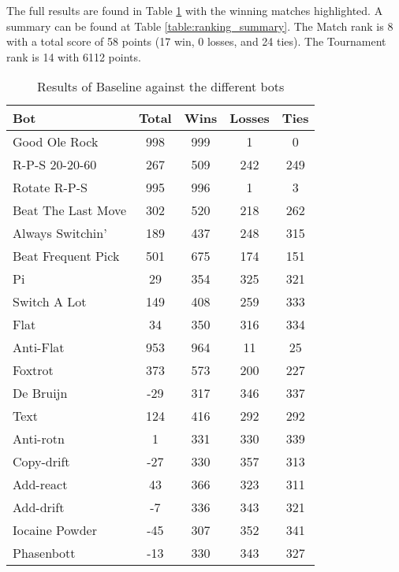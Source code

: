 The full results are found in Table \ref{table:base_results} with the winning matches highlighted. A summary can be found at Table \ref{table:ranking_summary}. The Match rank is 8 with a total score of 58 points (17 win, 0 losses, and 24 ties). The Tournament rank is 14 with 6112 points.

\begin{table}
    \caption{Results of Baseline against the different bots}
    \label{table:base_results}
    \centering
    \begin{tabular}{|l|c|c|c|c|}
        \hline
        \textbf{Bot} & \textbf{Total} & \textbf{Wins} & \textbf{Losses} & \textbf{Ties} \\ \hline
\rowcolor{HighlightRowColor} Good Ole Rock & 998 & 999 & 1 & 0 \\ \hline 
\rowcolor{HighlightRowColor} R-P-S 20-20-60 & 267 & 509 & 242 & 249 \\ \hline 
\rowcolor{HighlightRowColor} Rotate R-P-S & 995 & 996 & 1 & 3 \\ \hline 
\rowcolor{HighlightRowColor} Beat The Last Move & 302 & 520 & 218 & 262 \\ \hline 
\rowcolor{HighlightRowColor} Always Switchin' & 189 & 437 & 248 & 315 \\ \hline 
\rowcolor{HighlightRowColor} Beat Frequent Pick & 501 & 675 & 174 & 151 \\ \hline 
Pi & 29 & 354 & 325 & 321 \\ \hline 
\rowcolor{HighlightRowColor} Switch A Lot & 149 & 408 & 259 & 333 \\ \hline 
Flat & 34 & 350 & 316 & 334 \\ \hline 
\rowcolor{HighlightRowColor} Anti-Flat & 953 & 964 & 11 & 25 \\ \hline 
\rowcolor{HighlightRowColor} Foxtrot & 373 & 573 & 200 & 227 \\ \hline 
De Bruijn & -29 & 317 & 346 & 337 \\ \hline 
\rowcolor{HighlightRowColor} Text & 124 & 416 & 292 & 292 \\ \hline 
Anti-rotn & 1 & 331 & 330 & 339 \\ \hline 
Copy-drift & -27 & 330 & 357 & 313 \\ \hline 
Add-react & 43 & 366 & 323 & 311 \\ \hline 
Add-drift & -7 & 336 & 343 & 321 \\ \hline 
Iocaine Powder & -45 & 307 & 352 & 341 \\ \hline 
Phasenbott & -13 & 330 & 343 & 327 \\ \hline 

\end{tabular}
\end{table}
